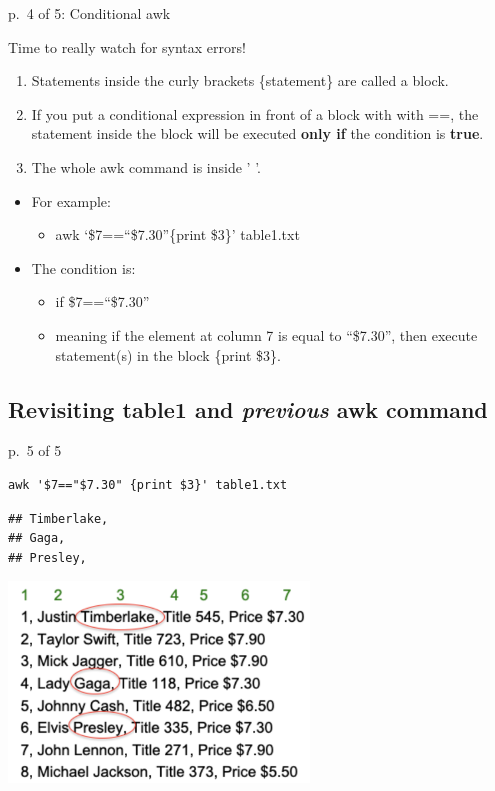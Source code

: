 \documentclass[
]{book}
\providecommand{\tightlist}{%
  \setlength{\itemsep}{0pt}\setlength{\parskip}{0pt}}
\begin{document}
p.~4 of 5: Conditional awk

Time to really watch for syntax errors!

\begin{enumerate}
\def\labelenumi{\arabic{enumi})}
\item
  Statements inside the curly brackets \{statement\} are called a block.
\item
  If you put a conditional expression in front of a block with with ==, the statement inside the block will be executed \textbf{only if} the condition is \textbf{true}.
\item
  The whole awk command is inside ' '.
\end{enumerate}

\begin{itemize}
\tightlist
\item
  For example:

  \begin{itemize}
  \tightlist
  \item
    awk `\$7==``\$7.30''\{print \$3\}' table1.txt
  \end{itemize}
\item
  The condition is:

  \begin{itemize}
  \tightlist
  \item
    if \$7==``\$7.30''
  \item
    meaning if the element at column 7 is equal to ``\$7.30'', then execute statement(s) in the block \{print \$3\}.
  \end{itemize}
\end{itemize}

\hypertarget{revisiting-table1-and-previous-awk-command}{%
\subsection{\texorpdfstring{Revisiting table1 and \emph{previous} awk command}{Revisiting table1 and previous awk command}}\label{revisiting-table1-and-previous-awk-command}}

p.~5 of 5

\begin{verbatim}
awk '$7=="$7.30" {print $3}' table1.txt
\end{verbatim}

\begin{verbatim}
## Timberlake,
## Gaga,
## Presley,
\end{verbatim}

\includegraphics[width=0.6\textwidth,height=\textheight]{./Figures/awk.png}
\end{document}
